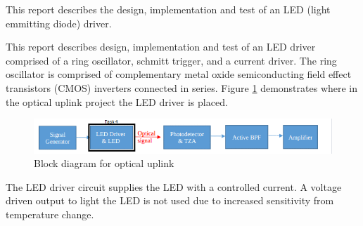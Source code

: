 




This report describes the design, implementation and test of an LED (light emmitting diode) driver. 

\noindent This report describes design, implementation and test of an LED driver comprised of a ring oscillator, schmitt trigger, and a current driver. The ring oscillator is comprised of complementary metal oxide semiconducting field effect transistors (CMOS) inverters connected in series. Figure \ref{fig:blockdiagram2} demonstrates where in the optical uplink project the LED driver is placed. 



\begin{figure}[H]
    \centering
    \includegraphics[width=.9\textwidth ]{Introduction/Block_Diagram_MFBP.png}
    \caption{Block diagram for optical uplink \cite{b1}}
    \label{fig:blockdiagram2}
\end{figure}


The LED driver circuit supplies the LED with a controlled current. A voltage driven output to light the LED is not used due to increased sensitivity from temperature change. 



